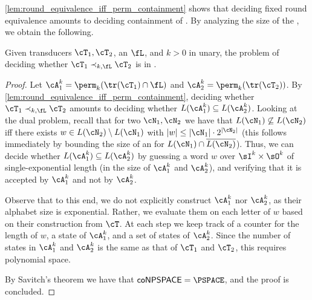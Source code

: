 \cref{lem:round_equivalence_iff_perm_containment} shows that deciding fixed round equivalence amounts to deciding containment of \NFAs. By analyzing the size of the \NFAs, we obtain the following.
\begin{theorem}
	\label{thm:fixed_re_PSPACE}
	Given transducers $\cT_1,\cT_2$, an \NFA $\fL$, and $k>0$ in unary, the problem of deciding whether $\cT_1\prec_{k,\fL}\cT_2$ is in \PSPACE.
\end{theorem}
\begin{proof}
	Let $\cA_1^k=\perm_k(\tr(\cT_1)\cap \fL)$ and $\cA_2^k=\perm_k(\tr(\cT_2))$. By \cref{lem:round_equivalence_iff_perm_containment}, deciding whether $\cT_1\prec_{k,\fL} \cT_2$ amounts to deciding whether $L(\cA^k_1)\subseteq L(\cA^k_2)$. Looking at the dual problem, recall that for two \NFAs $\cN_1, \cN_2$ we have that $L(\cN_1)\not\subseteq L(\cN_2)$ iff 
	there exists $w\in L(\cN_2)\setminus L(\cN_1)$ with $|w|\le |\cN_1|\cdot 2^{|\cN_2|}$ (this follows immediately by bounding the size of an \NFA for $L(\cN_1)\cap \overline{L(\cN_2)}$). Thus, we can decide whether $L(\cA^k_1)\subseteq L(\cA^k_2)$ by guessing a word $w$ over $\sI^k\times \sO^k$ of single-exponential length (in the size of $\cA^k_1$ and $\cA^k_2$), and verifying that it is accepted by $\cA^k_1$ and not by $\cA^k_2$. 
	
	Observe that to this end, we do not explicitly construct $\cA^k_1$ nor $\cA^k_2$, as their alphabet size is exponential. Rather, we evaluate them on each letter of $w$ based on their construction from $\cT$. At each step we keep track of a counter for the length of $w$, a state of $\cA^k_1$, and a set of states of $\cA^k_2$. Since the number of states in $\cA^k_1$ and $\cA^k_2$ is the same as that of $\cT_1$ and $\cT_2$, this requires polynomial space.
	
	By Savitch's theorem we have that $\mathsf{coNPSPACE}=\PSPACE$, and the proof is concluded.
\end{proof}

